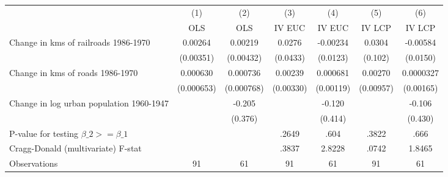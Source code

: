 {
\def\sym#1{\ifmmode^{#1}\else\(^{#1}\)\fi}
\begin{tabular}{l*{6}{c}}
\hline\hline
                &\multicolumn{1}{c}{(1)}&\multicolumn{1}{c}{(2)}&\multicolumn{1}{c}{(3)}&\multicolumn{1}{c}{(4)}&\multicolumn{1}{c}{(5)}&\multicolumn{1}{c}{(6)}\\
                &\multicolumn{1}{c}{OLS}&\multicolumn{1}{c}{OLS}&\multicolumn{1}{c}{IV EUC}&\multicolumn{1}{c}{IV EUC}&\multicolumn{1}{c}{IV LCP}&\multicolumn{1}{c}{IV LCP}\\
\hline
Change in kms of railroads 1986-1970&  0.00264         &  0.00219         &   0.0276         & -0.00234         &   0.0304         & -0.00584         \\
                &(0.00351)         &(0.00432)         & (0.0433)         & (0.0123)         &  (0.102)         & (0.0150)         \\
[1em]
Change in kms of roads 1986-1970& 0.000630         & 0.000736         &  0.00239         & 0.000681         &  0.00270         &0.0000327         \\
                &(0.000653)         &(0.000768)         &(0.00330)         &(0.00119)         &(0.00957)         &(0.00165)         \\
[1em]
Change in log urban population 1960-1947&                  &   -0.205         &                  &   -0.120         &                  &   -0.106         \\
                &                  &  (0.376)         &                  &  (0.414)         &                  &  (0.430)         \\
\hline
P-value for testing $\beta\_{2} >= \beta\_{1}$&                  &                  &    .2649         &     .604         &    .3822         &     .666         \\
Cragg-Donald (multivariate) F-stat&                  &                  &    .3837         &   2.8228         &    .0742         &   1.8465         \\
Observations    &       91         &       61         &       91         &       61         &       91         &       61         \\
\hline\hline
\end{tabular}
}
